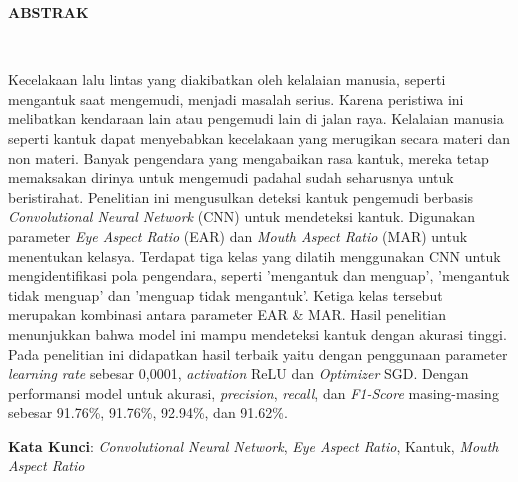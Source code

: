 \clearpage
\centering
{}
 \vspace{1em}
\normalsize \bfseries \centering \MakeUppercase{Abstrak}
% 
\\[2\baselineskip]

\justifying \normalfont \normalsize
{

Kecelakaan lalu lintas yang diakibatkan oleh kelalaian manusia, seperti mengantuk saat mengemudi, 
menjadi masalah serius. Karena peristiwa ini  melibatkan kendaraan lain atau pengemudi lain di jalan raya. 
Kelalaian manusia seperti kantuk dapat menyebabkan kecelakaan yang merugikan secara materi dan non materi. 
Banyak pengendara yang mengabaikan rasa kantuk, mereka tetap memaksakan dirinya untuk mengemudi padahal sudah 
seharusnya untuk beristirahat. Penelitian ini mengusulkan deteksi kantuk pengemudi berbasis \textit{Convolutional Neural Network} (CNN) untuk mendeteksi kantuk. Digunakan parameter \textit{Eye Aspect Ratio} (EAR) dan \textit{Mouth Aspect Ratio} (MAR) untuk menentukan kelasya. Terdapat tiga kelas yang dilatih menggunakan CNN untuk mengidentifikasi pola pengendara, seperti 'mengantuk dan menguap', 'mengantuk tidak menguap' dan 'menguap tidak mengantuk'. Ketiga kelas tersebut 
merupakan kombinasi antara parameter EAR \& MAR. Hasil penelitian menunjukkan bahwa model ini mampu mendeteksi kantuk dengan akurasi tinggi. Pada penelitian ini didapatkan hasil terbaik yaitu dengan penggunaan parameter \textit{learning rate} sebesar 0,0001, \textit{activation} ReLU dan \textit{Optimizer} SGD. Dengan performansi model untuk akurasi, \textit{precision}, \textit{recall}, dan \textit{F1-Score} masing-masing 
sebesar 91.76\%, 91.76\%, 92.94\%, dan 91.62\%.

}

\textbf{Kata Kunci}: \textit{Convolutional Neural Network}, \textit{Eye Aspect Ratio}, Kantuk, \textit{Mouth Aspect Ratio}
\clearpage